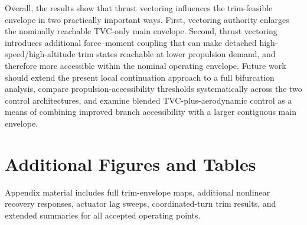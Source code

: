 \documentclass[conf]{new-aiaa}
\begin{document}
Overall, the results show that thrust vectoring influences the trim-feasible envelope in two practically important ways. First, vectoring authority enlarges the nominally reachable TVC-only main envelope. Second, thrust vectoring introduces additional force--moment coupling that can make detached high-speed/high-altitude trim states reachable at lower propulsion demand, and therefore more accessible within the nominal operating envelope. Future work should extend the present local continuation approach to a full bifurcation analysis, compare propulsion-accessibility thresholds systematically across the two control architectures, and examine blended TVC-plus-aerodynamic control as a means of combining improved branch accessibility with a larger contiguous main envelope.




\appendix
\renewcommand{\thefigure}{A\arabic{figure}}
\setcounter{figure}{0}
\renewcommand{\thetable}{A\arabic{table}}
\setcounter{table}{0}

\section{Additional Figures and Tables}
Appendix material includes full trim-envelope maps, additional nonlinear recovery responses, actuator lag sweeps, coordinated-turn trim results, and extended summaries for all accepted operating points.
\end{document}
